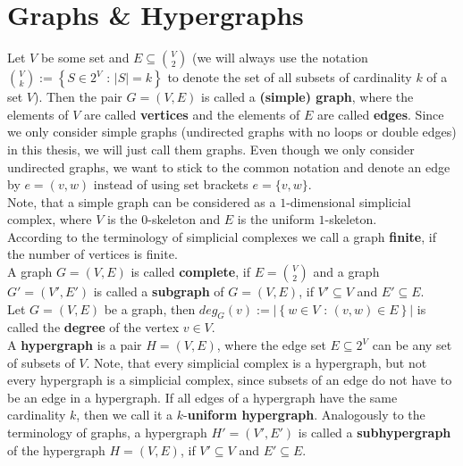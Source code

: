 \section{Graphs \& Hypergraphs}

Let \(V\) be some set and \(E\subseteq\binom{V}{2}\) (we will always use the notation\\
\(\binom{V}{k}:=\left\{S\in 2^V\text{ : }\left|S\right|=k\right\}\) to denote the set of all subsets of cardinality \(k\) of a set \(V\)). Then the pair \(G=\left(V,E\right)\) is called a \textbf{(simple) graph}, where the elements of \(V\) are called \textbf{vertices} and the elements of \(E\) are called \textbf{edges}. Since we only consider simple graphs (undirected graphs with no loops or double edges) in this thesis, we will just call them graphs. Even though we only consider undirected graphs, we want to stick to the common notation and denote an edge by \(e=(v,w)\) instead of using set brackets \(e=\{v,w\}\).\\
Note, that a simple graph can be considered as a \(1\)-dimensional simplicial complex, where \(V\) is the \(0\)-skeleton and \(E\) is the uniform \(1\)-skeleton.\\
According to the terminology of simplicial complexes we call a graph \textbf{finite}, if the number of vertices is finite.\\
A graph \(G=(V,E)\) is called \textbf{complete}, if \(E=\binom{V}{2}\) and a graph \(G'=(V',E')\) is called a \textbf{subgraph} of \(G=(V,E)\), if \(V'\subseteq V\) and \(E'\subseteq E\).\\
Let \(G=(V,E)\) be a graph, then \(deg_G(v):=\left|\left\{w\in V\text{ : }(v,w)\in E\right\}\right|\) is called the \textbf{degree} of the vertex \(v\in V\).\\
A \textbf{hypergraph} is a pair \(H=(V,E)\), where the edge set \(E\subseteq 2^V\) can be any set of subsets of \(V\). Note, that every simplicial complex is a hypergraph, but not every hypergraph is a simplicial complex, since subsets of an edge do not have to be an edge in a hypergraph. If all edges of a hypergraph have the same cardinality \(k\), then we call it a \(k\)-\textbf{uniform hypergraph}. Analogously to the terminology of graphs, a hypergraph \(H'=(V',E')\) is called a \textbf{subhypergraph} of the hypergraph \(H=(V,E)\), if \(V'\subseteq V\) and \(E'\subseteq E\).